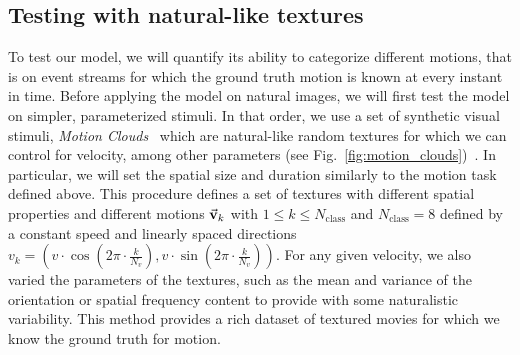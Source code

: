 \documentclass[default]{sn-jnl}%
\theoremstyle{thmstyleone}%
\theoremstyle{thmstyletwo}%
\theoremstyle{thmstylethree}%
\newcommand{\seeFig}[1]{see Fig.~\ref{fig:#1}}%
\newcommand{\Nclass}{N_\text{class}} %
\newcommand{\kernelind}{k} %
\newcommand{\speed}{v}
\newcommand{\Nspeed}{N_v}
\newcommand{\note}[1]{{\sethlcolor{yellow}\hl{#1}}}
\begin{document}
%

%
\subsection{Testing with natural-like textures}
To test our model, we will quantify its ability to categorize different motions, that is on event streams for which the ground truth motion is known at every instant in time. Before applying the model on natural images, we will first test the model on simpler, parameterized stimuli. In that order, we use a set of synthetic visual stimuli, \textit{Motion Clouds}~\citep{leon_motion_2012} which are natural-like random textures for which we can control for velocity, among other parameters (\seeFig{motion_clouds})~\citep{vacher_bayesian_2018}. In particular, we will set the spatial size and duration similarly to the motion task defined above. This procedure defines a set of textures with different spatial properties and different motions $\va{v}_k$ with  $1 \le k \le \Nclass$ and $\Nclass=8$ defined by a constant speed and linearly spaced directions $
\speed_\kernelind = 
  ( 
    \speed \cdot \cos(2\pi\cdot \frac{\kernelind}{\Nspeed}),
    \speed \cdot \sin(2\pi\cdot \frac{\kernelind}{\Nspeed})
  )
$.
For any given velocity, we also varied the parameters of the textures, such as the mean and variance of the orientation or spatial frequency content to provide with some naturalistic variability. This method provides a rich dataset of textured movies for which we know the ground truth for motion.
\end{document}
